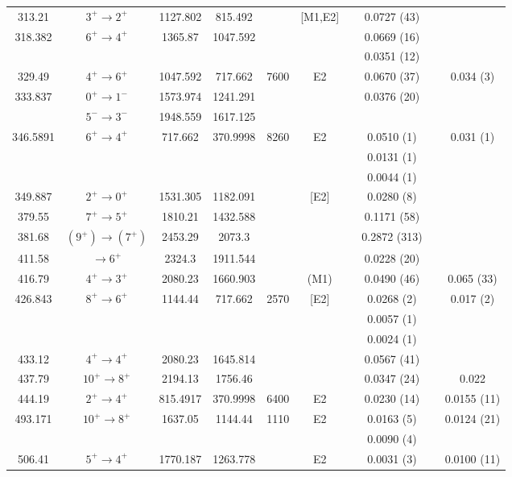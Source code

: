 \begin{landscape}
\begin{longtable}{c|c|c|c|c|c|c|c|c|c}
313.21	&	$3^+	\rightarrow	2^+$	&	1127.802	&	815.492	&		&	[M1,E2]	&		&	0.0727	(43)	&		&		\\
318.382	&	$6^+	\rightarrow	4^+$	&	1365.87	&	1047.592	&		&		&		&	0.0669	(16)	&		&		\\
	&				&		&		&		&		&		&	0.0351	(12)	&		&		\\
329.49	&	$4^+	\rightarrow	6^+$	&	1047.592	&	717.662	&	7600	&	E2	&		&	0.0670	(37)	&		&	0.034 (3)	\\
333.837	&	$0^+	\rightarrow	1^-$	&	1573.974	&	1241.291	&		&		&		&	0.0376	(20)	&		&		\\
	&	$5^-	\rightarrow	3^-$	&	1948.559	&	1617.125	&		&		&		&					&		&		\\
346.5891	&	$6^+	\rightarrow	4^+$	&	717.662	&	370.9998	&	8260	&	E2	&		&	0.0510	(1)	&		&	0.031 (1)	\\
	&				&		&		&		&		&		&	0.0131	(1)	&		&		\\
	&				&		&		&		&		&		&	0.0044	(1)	&		&		\\
349.887	&	$2^+	\rightarrow	0^+$	&	1531.305	&	1182.091	&		&	[E2]	&		&	0.0280	(8)	&		&		\\
379.55	&	$7^+	\rightarrow	5^+$	&	1810.21	&	1432.588	&		&		&		&	0.1171	(58)	&		&		\\
381.68	&	$(9^+)	\rightarrow	(7^+)$	&	2453.29	&	2073.3	&		&		&		&	0.2872	(313)	&		&		\\
411.58	&	$	\rightarrow	6^+$	&	2324.3	&	1911.544	&		&		&		&	0.0228	(20)	&		&		\\
416.79	&	$4^+	\rightarrow	3^+$	&	2080.23	&	1660.903	&		&	(M1)	&		&	0.0490	(46)	&		&	0.065 (33)	\\
426.843	&	$8^+	\rightarrow	6^+$	&	1144.44	&	717.662	&	2570	&	[E2]	&		&	0.0268	(2)	&		&	0.017 (2)	\\
	&				&		&		&		&		&		&	0.0057	(1)	&		&		\\
	&				&		&		&		&		&		&	0.0024	(1)	&		&		\\
433.12	&	$4^+	\rightarrow	4^+$	&	2080.23	&	1645.814	&		&		&		&	0.0567	(41)	&		&		\\
437.79	&	$10^+	\rightarrow	8^+$	&	2194.13	&	1756.46	&		&		&		&	0.0347	(24)	&		&	0.022	\\
444.19	&	$2^+	\rightarrow	4^+$	&	815.4917	&	370.9998	&	6400	&	E2	&		&	0.0230	(14)	&		&	0.0155 (11)	\\
493.171	&	$10^+	\rightarrow	8^+$	&	1637.05	&	1144.44	&	1110	&	E2	&		&	0.0163	(5)	&		&	0.0124 (21)	\\
	&				&		&		&		&		&		&	0.0090	(4)	&		&		\\
506.41	&	$5^+	\rightarrow	4^+$	&	1770.187	&	1263.778	&		&	E2	&		&	0.0031	(3)	&		&	0.0100 (11)	\\

\end{longtable}
\end{landscape}
